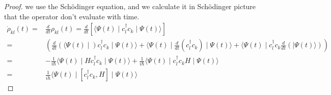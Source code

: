   \begin{proof}
    we use the Sch{\"o}dinger equation, and we calculate it in Sch{\"o}dinger picture that the operator don't evaluate with time.
    \begin{equation}
      \begin{aligned}
        \dot{\rho}_{kl}(t) =& \frac{d}{dt}\rho_{kl}(t) = \frac{d}{dt}\left[\langle \Psi(t) \mid c_l^\dagger c_k \mid \Psi(t) \rangle\right]\\
                                =& \left( \frac{d}{dt}(\langle \Psi(t) \mid) c_l^\dagger c_k \mid \Psi(t) \rangle + \langle \Psi(t) \mid \frac{d}{dt}(c_l^\dagger c_k) \mid \Psi(t) \rangle + \langle \Psi(t) \mid c_l^\dagger c_k \frac{d}{dt}(\mid \Psi(t) \rangle)\right)\\
                                =& -\frac{1}{i\hbar}\langle \Psi(t) \mid Hc_l^\dagger c_k \mid \Psi(t) \rangle + \frac{1}{i\hbar}\langle \Psi(t) \mid c_l^\dagger c_kH \mid \Psi(t) \rangle\\
                                =&\frac{1}{i\hbar}\langle \Psi(t) \mid [c_l^\dagger c_k,H] \mid \Psi(t) \rangle \label{tdhf4}
      \end{aligned}
    \end{equation}
  \end{proof}

